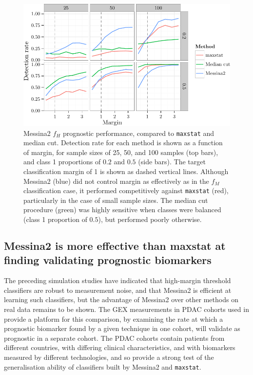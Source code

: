 \documentclass[dissertation.tex]{subfiles}
\begin{document}
\begin{figure}[!htbp]
\centering
\includegraphics[width=\linewidth]{analysis/messina/figure/06-E2B-E2B-plots-1}
\caption[Messina2 prognostic performance compared to alternative methods]{Messina2 $f_H$ prognostic performance, compared to \texttt{maxstat} and median cut.  Detection rate for each method is shown as a function of margin, for sample sizes of 25, 50, and 100 samples (top bars), and class 1 proportions of $0.2$ and $0.5$ (side bars).  The target classification margin of 1 is shown as dashed vertical lines.  Although Messina2 (blue) did not control margin as effectively as in the $f_M$ classification case, it performed competitively against \texttt{maxstat} (red), particularly in the case of small sample sizes.  The median cut procedure (green) was highly sensitive when classes were balanced (class 1 proportion of $0.5$), but performed poorly otherwise.}\label{fig:mess-vs-maxstat}
\end{figure}

\subsection[Messina2 vs maxstat: prognostic classifier training]{Messina2 is more effective than maxstat at finding validating prognostic biomarkers}
The preceding simulation studies have indicated that high-margin threshold classifiers are robust to measurement noise, and that Messina2 is efficient at learning such classifiers, but the advantage of Messina2 over other methods on real data remains to be shown.  The \gls{GEX} measurements in \gls{PDAC} cohorts used in  provide a platform for this comparison, by examining the rate at which a prognostic biomarker found by a given technique in one cohort, will validate as prognostic in a separate cohort.  The \gls{PDAC} cohorts contain patients from different countries, with differing clinical characteristics, and with biomarkers measured by different technologies, and so provide a strong test of the generalisation ability of classifiers built by Messina2 and \texttt{maxstat}.
\end{document}
